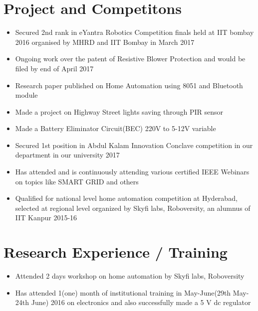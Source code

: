 \documentclass[]{article}
\begin{document}
\section{Project and Competitons }
\begin{itemize}
\item Secured 2nd rank in eYantra Robotics Competition finals held at IIT bombay 2016 organised by MHRD and IIT Bombay in March 2017
\item Ongoing work over the patent of Resistive Blower Protection and would be filed by end of April 2017
\item Research paper published on Home Automation using 8051 and Bluetooth module
\item Made a project on Highway Street lights saving through PIR sensor 
\item Made a Battery Eliminator Circuit(BEC) 220V to 5-12V variable
\item Secured 1st position in Abdul Kalam Innovation Conclave competition in our department in our university 2017
\item Has attended and is continuously attending various certified IEEE Webinars on topics like SMART GRID and others
\item Qualified for national level home automation competition at Hyderabad, selected at regional level organized by Skyfi labs, Roboversity, an alumnus of IIT Kanpur 2015-16 
\end{itemize}

\pagebreak

\section{Research Experience / Training }
\begin{itemize}
\item Attended 2 days workshop on home automation by Skyfi labs, Roboversity
\item Has attended 1(one) month of institutional training in May-June(29th May-24th June) 2016 on electronics and also successfully made a 5 V dc regulator
\end{itemize}
\end{document}
